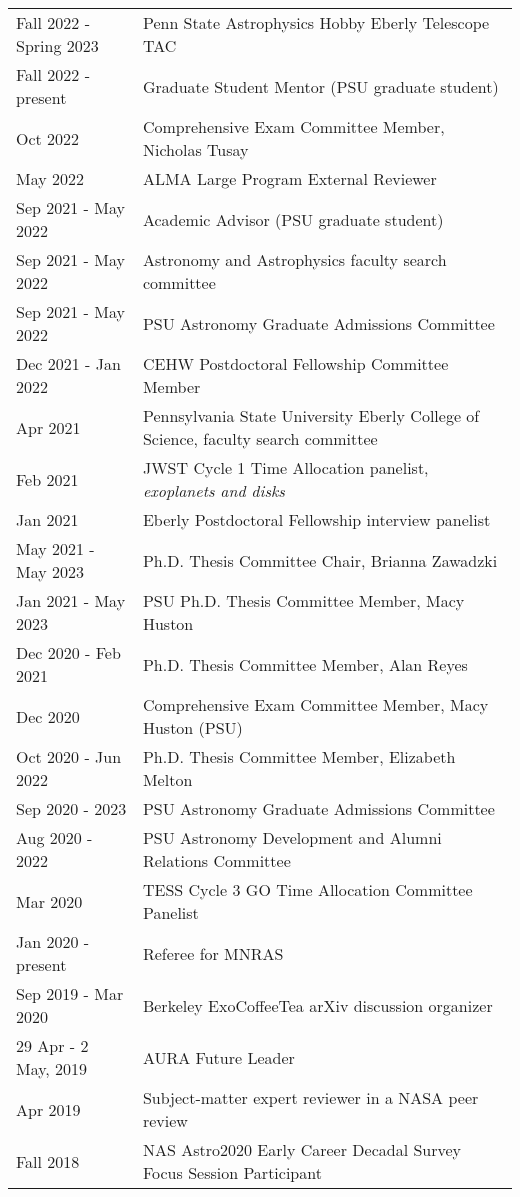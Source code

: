\begin{tabular*}{\textwidth}{@{\hspace{10pt}}p{1.4in}l}
Fall 2022 - Spring 2023 & Penn State Astrophysics Hobby Eberly Telescope TAC \\
Fall 2022 - present & Graduate Student Mentor (PSU graduate student) \\ %
Oct 2022 & Comprehensive Exam Committee Member, Nicholas Tusay \\
May 2022 & ALMA Large Program External Reviewer \\
Sep 2021 - May 2022 & Academic Advisor (PSU graduate student) \\ %
Sep 2021 - May 2022 & Astronomy and Astrophysics faculty search committee\\
Sep 2021 - May 2022 & PSU Astronomy Graduate Admissions Committee \\ 
Dec 2021 - Jan 2022 & CEHW Postdoctoral Fellowship Committee Member \\
Apr 2021 & Pennsylvania State University Eberly College of Science, faculty search committee\\
Feb 2021 & JWST Cycle 1 Time Allocation panelist, \emph{exoplanets and disks}\\
Jan 2021 & Eberly Postdoctoral Fellowship interview panelist\\
May 2021 - May 2023 & Ph.D. Thesis Committee Chair, Brianna Zawadzki\\
Jan 2021 - May 2023 & PSU Ph.D. Thesis Committee Member, Macy Huston\\
Dec 2020 - Feb 2021 & Ph.D. Thesis Committee Member, Alan Reyes\\
Dec 2020 & Comprehensive Exam Committee Member, Macy Huston (PSU)\\
Oct 2020 - Jun 2022 & Ph.D. Thesis Committee Member, Elizabeth Melton\\
Sep 2020 - 2023 & PSU Astronomy Graduate Admissions Committee \\ 
Aug 2020 - 2022 & PSU Astronomy Development and Alumni Relations Committee \\
Mar 2020 & TESS Cycle 3 GO Time Allocation Committee Panelist \\
Jan 2020 - present & Referee for MNRAS \\ 
Sep 2019 - Mar 2020 & Berkeley ExoCoffeeTea arXiv discussion organizer \\ 
29 Apr - 2 May, 2019 & AURA Future Leader \\
Apr 2019 & Subject-matter expert reviewer in a NASA peer review \\
Fall 2018 & NAS Astro2020 Early Career Decadal Survey Focus Session Participant \\

\end{tabular*}
